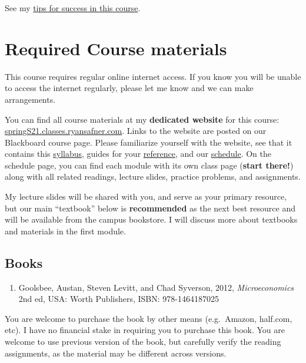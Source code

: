 \documentclass{article}
\providecommand{\tightlist}{%
  \setlength{\itemsep}{0pt}\setlength{\parskip}{0pt}}
\begin{document}
See my
\href{http://springS21.classes.ryansafner.com/reference\#tips}{tips for
success in this course}.

\hypertarget{required-course-materials}{%
\section*{Required Course materials}\label{required-course-materials}}

This course requires regular online internet access. If you know you
will be unable to access the internet regularly, please let me know and
we can make arrangements.

You can find all course materials at my \textbf{dedicated website} for
this course:
\href{https://springS21.classes.ryansafner.com}{springS21.classes.ryansafner.com}.
Links to the website are posted on our Blackboard course page. Please
familiarize yourself with the website, see that it contains this
\href{https://springS21.classes.ryansafner.com/syllabus/}{syllabus},
guides for your
\href{https://springS21.classes.ryansafner.com/reference/}{reference},
and our
\href{https://springS21.classes.ryansafner.com/schedule/}{schedule}. On
the schedule page, you can find each module with its own class page
(\textbf{start there!}) along with all related readings, lecture slides,
practice problems, and assignments.

My lecture slides will be shared with you, and serve as your primary
resource, but our main ``textbook'' below is \textbf{recommended} as the
next best resource and will be available from the campus bookstore. I
will discuss more about textbooks and materials in the first module.

\hypertarget{books}{%
\subsection*{Books}\label{books}}

\begin{enumerate}
\def\labelenumi{\arabic{enumi}.}
\tightlist
\item
  Goolsbee, Austan, Steven Levitt, and Chad Syverson, 2012,
  \emph{Microeconomics} 2nd ed, USA: Worth Publishers, ISBN:
  978-1464187025
\end{enumerate}

You are welcome to purchase the book by other means (e.g.~Amazon,
half.com, etc). I have no financial stake in requiring you to purchase
this book. You are welcome to use previous version of the book, but
carefully verify the reading assignments, as the material may be
different across versions.
\end{document}
